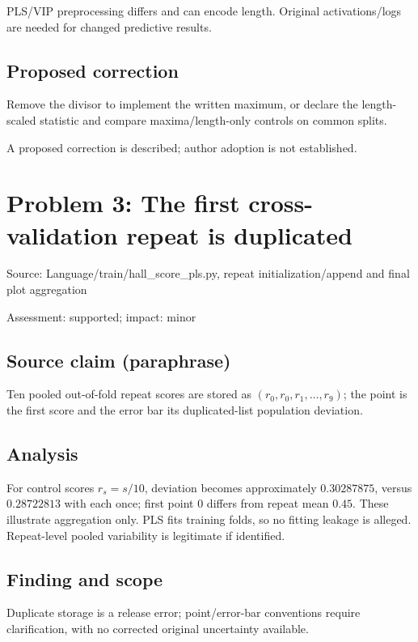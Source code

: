 \documentclass[11pt]{article}
\begin{document}
PLS/VIP preprocessing differs and can encode length. Original activations/logs are needed for changed predictive results.

\subsection*{Proposed correction}

Remove the divisor to implement the written maximum, or declare the length-scaled statistic and compare maxima/length-only controls on common splits.

A proposed correction is described; author adoption is not established.

\section*{Problem 3: The first cross-validation repeat is duplicated}

Source: Language/train/hall\_score\_pls.py, repeat initialization/append and final plot aggregation

Assessment: supported; impact: minor

\subsection*{Source claim (paraphrase)}

Ten pooled out-of-fold repeat scores are stored as \((r_0,r_0,r_1,\ldots,r_9)\); the point is the first score and the error bar its duplicated-list population deviation.

\subsection*{Analysis}

For control scores \(r_s=s/10\), deviation becomes approximately \(0.30287875\), versus \(0.28722813\) with each once; first point \(0\) differs from repeat mean \(0.45\). These illustrate aggregation only. PLS fits training folds, so no fitting leakage is alleged. Repeat-level pooled variability is legitimate if identified.

\subsection*{Finding and scope}

Duplicate storage is a release error; point/error-bar conventions require clarification, with no corrected original uncertainty available.
\end{document}
